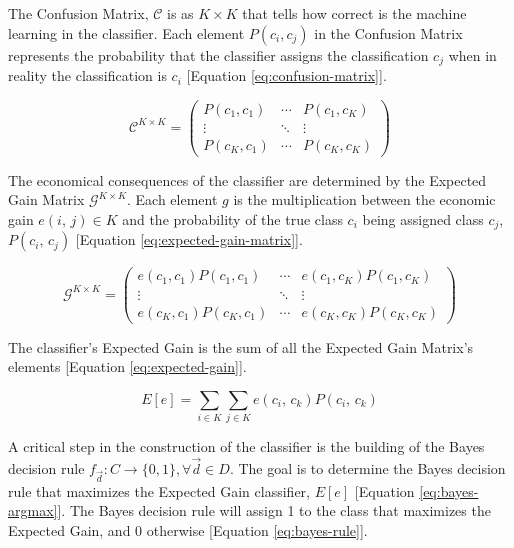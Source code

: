 \documentclass[letterpaper, conference]{IEEEtran}
\begin{document}
The Confusion Matrix, $\mathcal{C}$ is as $K \times K$ that tells how correct is the machine learning in the classifier. Each element $P(c_i, c_j)$ in the Confusion Matrix represents the probability that the classifier assigns the classification $c_j$ when in reality the classification is $c_i$ [Equation \ref{eq:confusion-matrix}].

\begin{equation}\label{eq:confusion-matrix}
  \mathcal{C}^{K \times K} = \begin{pmatrix}
    P(c_1,c_1) & \cdots & P(c_1,c_K) \\
      \vdots   & \ddots &   \vdots   \\
    P(c_K,c_1) & \cdots & P(c_K,c_K)
  \end{pmatrix}
\end{equation}

The economical consequences of the classifier are determined by the Expected Gain Matrix $\mathcal{G}^{K \times K}$. Each element $g$ is the multiplication between the economic gain $e(i,\, j) \in K$ and the probability of the true class $c_i$ being assigned class $c_j$, $P(c_i,\, c_j)$ [Equation \ref{eq:expected-gain-matrix}].

\begin{equation}\label{eq:expected-gain-matrix}
  \mathcal{G}^{K \times K} = \begin{pmatrix}
    e(c_1,c_1)P(c_1,c_1) & \cdots & e(c_1,c_K)P(c_1,c_K) \\
              \vdots    & \ddots &            \vdots     \\
    e(c_K,c_1)P(c_K,c_1) & \cdots & e(c_K,c_K)P(c_K,c_K)
  \end{pmatrix}
\end{equation}

The classifier's Expected Gain is the sum of all the Expected Gain Matrix's elements [Equation \ref{eq:expected-gain}].

\begin{equation}\label{eq:expected-gain}
  E[e] = \sum_{i \in K} \sum_{j \in K}e(c_i,\,c_k)\mathbin{}P(c_i,\,c_k)
\end{equation}

A critical step in the construction of the classifier is the building of the Bayes decision rule $f_{\vec{d}}:C \longrightarrow \{0, 1\}, \forall \vec{d} \in D$. The goal is to determine the Bayes decision rule that maximizes the Expected Gain classifier, $E[e]$ [Equation \ref{eq:bayes-argmax}]. The Bayes decision rule will assign 1 to the class that maximizes the Expected Gain, and 0 otherwise [Equation \ref{eq:bayes-rule}].
\end{document}
